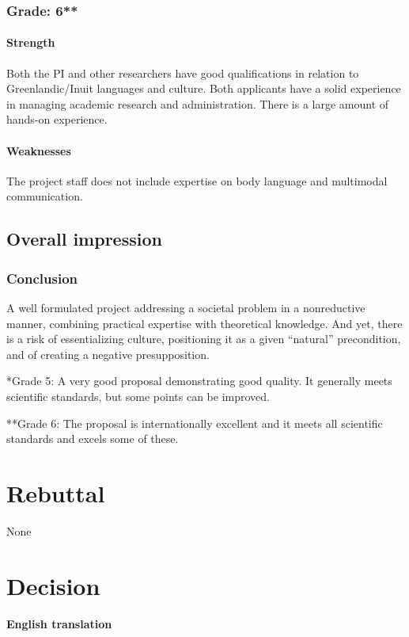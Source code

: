 \documentclass[twocolumn, serif, rga, authordate]{jote-article}
\begin{document}
\subsubsection*{Grade: 6**}

\paragraph{Strength}
Both the PI and other researchers have good qualifications in relation to Greenlandic/Inuit languages and culture. Both applicants have a solid experience in managing academic research and administration. There is a large amount of hands-on experience.

\paragraph{Weaknesses}
The project staff does not include expertise on body language and multimodal communication.

\subsection*{Overall impression}
\subsubsection*{Conclusion}
A well formulated project addressing a societal problem in a nonreductive manner, combining practical expertise with theoretical knowledge. And yet, there is a risk of essentializing culture, positioning it as a given ``natural'' precondition, and of creating a negative presupposition.

*Grade 5: A very good proposal demonstrating good quality. It generally meets scientific standards, but some points can be improved.

**Grade 6: The proposal is internationally excellent and it meets all scientific standards and excels some of these.


\section*{Rebuttal}


None


\section*{Decision}

\paragraph{English translation}
\end{document}
